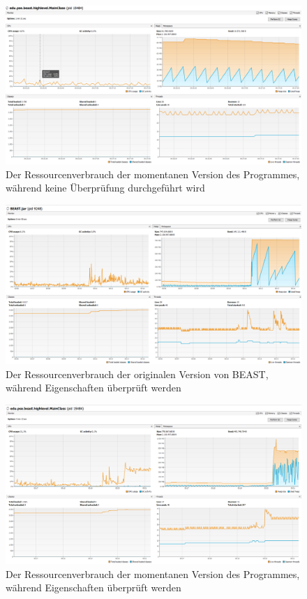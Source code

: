 \documentclass[a4paper]{scrreprt}
\begin{document}
\vspace{4cm}

\begin{figure}[ht]
	\centering
  \includegraphics[width=1.0\textwidth,
  height=0.40\textwidth]{images/NEW_NO.png} \caption{Der Ressourcenverbrauch der
  momentanen Version des Programmes, während keine Überprüfung durchgeführt wird}
	\label{fig2}
\end{figure}


\newpage

\begin{figure}[ht]
	\centering
  \includegraphics[width=1.0\textwidth,
  height=0.4\textwidth]{images/OLD_YES.png} \caption{Der Ressourcenverbrauch
 der originalen Version von BEAST, während Eigenschaften überprüft werden}
	\label{fig3}
\end{figure}

\vspace{4cm}

\begin{figure}[ht]
	\centering
  \includegraphics[width=1.0\textwidth,
  height=0.40\textwidth]{images/NEW_YES.png} \caption{Der Ressourcenverbrauch der
  momentanen Version des Programmes, während Eigenschaften überprüft werden}
	\label{fig4}
\end{figure}
\end{document}
